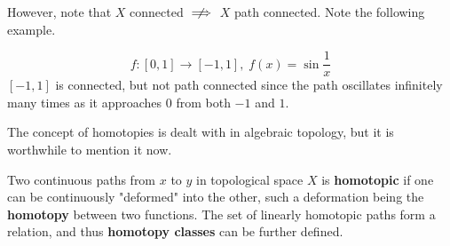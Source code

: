 \documentclass{article}
\begin{document}
    \begin{center}
    \end{center}

    However, note that $X$ connected $\centernot\implies$ $X$ path connected. Note the following example. 

    \begin{example}
    \[ f:[0,1] \longrightarrow [-1,1], \; f(x) = \sin{\frac{1}{x}}\]
    $[-1,1]$ is connected, but not path connected since the path oscillates infinitely many times as it approaches $0$ from both $-1$ and $1$. 
    \end{example}

    The concept of homotopies is dealt with in algebraic topology, but it is worthwhile to mention it now. 

    \begin{definition}
    Two continuous paths from $x$ to $y$ in topological space $X$ is \textbf{homotopic} if one can be continuously "deformed" into the other, such a deformation being the \textbf{homotopy} between two functions. The set of linearly homotopic paths form a relation, and thus \textbf{homotopy classes} can be further defined. 
    \end{definition}
\end{document}
